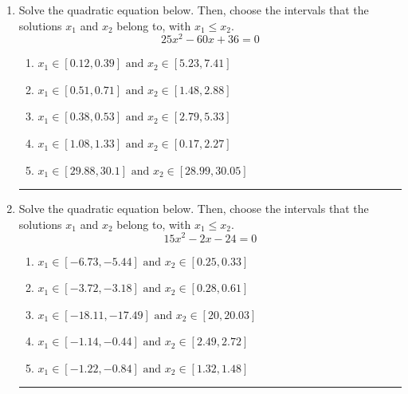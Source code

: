 \documentclass[14pt]{extbook}
\newcommand{\litem}[1]{\item#1\hspace*{-1cm}\rule{\textwidth}{0.4pt}}
\begin{document}
\begin{enumerate}
{\begin{enumerate}[label=\Alph*.]
\end{enumerate} }
\litem{
Solve the quadratic equation below. Then, choose the intervals that the solutions $x_1$ and $x_2$ belong to, with $x_1 \leq x_2$.\[ 25x^{2} -60 x + 36 = 0 \]\begin{enumerate}[label=\Alph*.]
\item \( x_1 \in [0.12, 0.39] \text{ and } x_2 \in [5.23, 7.41] \)
\item \( x_1 \in [0.51, 0.71] \text{ and } x_2 \in [1.48, 2.88] \)
\item \( x_1 \in [0.38, 0.53] \text{ and } x_2 \in [2.79, 5.33] \)
\item \( x_1 \in [1.08, 1.33] \text{ and } x_2 \in [0.17, 2.27] \)
\item \( x_1 \in [29.88, 30.1] \text{ and } x_2 \in [28.99, 30.05] \)

\end{enumerate} }
\litem{
Solve the quadratic equation below. Then, choose the intervals that the solutions $x_1$ and $x_2$ belong to, with $x_1 \leq x_2$.\[ 15x^{2} -2 x -24 = 0 \]\begin{enumerate}[label=\Alph*.]
\item \( x_1 \in [-6.73, -5.44] \text{ and } x_2 \in [0.25, 0.33] \)
\item \( x_1 \in [-3.72, -3.18] \text{ and } x_2 \in [0.28, 0.61] \)
\item \( x_1 \in [-18.11, -17.49] \text{ and } x_2 \in [20, 20.03] \)
\item \( x_1 \in [-1.14, -0.44] \text{ and } x_2 \in [2.49, 2.72] \)
\item \( x_1 \in [-1.22, -0.84] \text{ and } x_2 \in [1.32, 1.48] \)


\end{enumerate}}
\end{enumerate}
\end{document}
